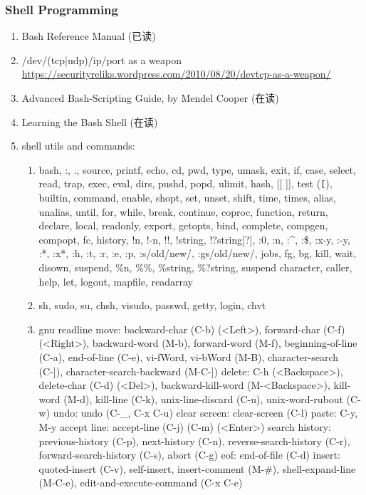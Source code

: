 \documentclass{article}
\begin{document}
\subsubsection{Shell Programming}
%
\begin{enumerate}
    \item Bash Reference Manual (已读)
    \item /dev/(tcp|udp)/ip/port as a weapon \url{https://securityreliks.wordpress.com/2010/08/20/devtcp-as-a-weapon/}
    \item Advanced Bash-Scripting Guide, by Mendel Cooper (在读)
    \item Learning the Bash Shell (在读)
    \item shell utils and commands:
        \begin{enumerate}
            \item bash, :, ., source, printf, echo, cd, pwd, type, umask, exit, if, case, select, read, trap, exec, eval, dirs, pushd, popd, ulimit, hash, [[ ]], test (\verb|[|), builtin, command, enable, shopt, set, unset, shift, time, times, alias, unalias, until, for, while, break, continue, coproc, function, return, declare, local, readonly, export, getopts, bind, complete, compgen, compopt, fc, history, !n, !-n, !!, !string, !?string[?], :0, :n, :^, :\$, :x-y, :-y, :*, :x*, :h, :t, :r, :e, :p, :s/old/new/, :gs/old/new/, jobs, fg, bg, kill, wait, disown, suspend, \%n, \%\%, \%string, \%?string, suspend character, caller, help, let, logout, mapfile, readarray
            \item sh, sudo, su, chsh, visudo, passwd, getty, login, chvt
            \item gnu readline
                move: backward-char (C-b) (<Left>), forward-char (C-f) (<Right>), backward-word (M-b), forward-word (M-f), beginning-of-line (C-a), end-of-line (C-e), vi-fWord, vi-bWord (M-B), character-search (C-]), character-search-backward (M-C-])
                delete: C-h (<Backspace>), delete-char (C-d) (<Del>), backward-kill-word (M-<Backspace>), kill-word (M-d), kill-line (C-k), unix-line-discard (C-u), unix-word-rubout (C-w)
                undo: undo (C-_, C-x C-u)
                clear screen: clear-screen (C-l)
                paste: C-y, M-y
                accept line: accept-line (C-j) (C-m) (<Enter>)
                search history: previous-history (C-p), next-history (C-n), reverse-search-history (C-r), forward-search-history (C-s), abort (C-g)
                eof: end-of-file (C-d)
                insert: quoted-insert (C-v), self-insert, insert-comment (M-#), shell-expand-line (M-C-e), edit-and-execute-command (C-x C-e)

\end{enumerate}
\end{enumerate}
\end{document}
